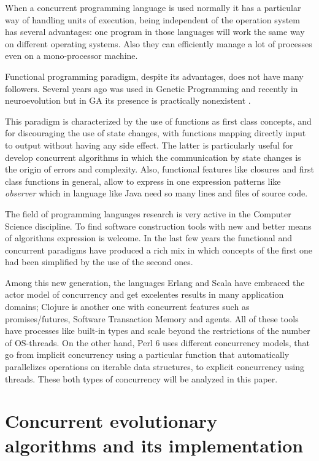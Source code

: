 \documentclass[sigconf]{acmart}
\begin{document}
When a concurrent programming language is used normally it has a
particular way of handling units of execution, being independent of
the operation system has several advantages: one program in those
languages will work the same way on different operating systems. Also
they can efficiently manage a lot of processes even on a
mono-processor machine.


Functional programming paradigm, despite its advantages, does not have
many followers. Several years ago was used in Genetic Programming
\cite{Briggs:2008:FGP:1375341.1375345,Huelsbergen:1996:TSE:1595536.1595579,walsh:1999:AFSFESIHLP}
and recently in neuroevolution \cite{Sher2013} but in GA its presence
is practically nonexistent \cite{Hawkins:2001:GFG:872017.872197}. 

This paradigm is characterized by the use of functions as first
class concepts, and for discouraging the use of state changes, with
functions mapping directly input to output without having any side effect. The
latter is particularly useful for develop concurrent algorithms in
which the communication by state changes is the origin of errors and
complexity. Also, functional features like closures and first class
functions in general, allow to express in one expression patterns like
\emph{observer} which in language like Java need so many lines and
files of source code.

The field of programming languages research is very active in the
Computer Science discipline. To find software construction tools with
new and better means of algorithms expression is welcome. In the last
few years the functional and concurrent paradigms have produced a rich
mix in which concepts of the first one had been simplified by the use
of the second ones. 

Among this new generation, the languages Erlang and Scala have
embraced the actor model of concurrency and get excelentes results in
many application domains; Clojure is another one with concurrent
features such as promises/futures, Software Transaction Memory and
agents. All of these tools have processes like built-in types and
scale beyond the restrictions of the number of OS-threads. On the
other hand, Perl 6 \cite{Tang:2007:PRI:1190215.1190218} uses different
concurrency models, that go from implicit concurrency using a
particular function that automatically parallelizes operations on
iterable data structures, to explicit concurrency using threads. These
both types of concurrency will be analyzed in this paper.

\section{Concurrent evolutionary algorithms and its implementation}
\label{sec:impl}
\end{document}
